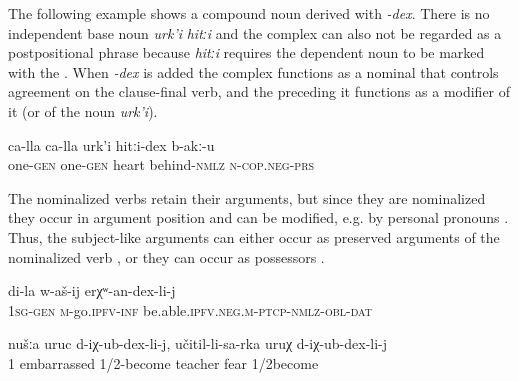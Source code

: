 The following example shows a compound noun derived with \textit{-dex}. There is no independent base noun \textit{urk'i} \textit{hitːi} and the complex can also not be regarded as a postpositional phrase because \textit{hitːi} requires the dependent noun to be marked with the . When \textit{-dex} is added the complex functions as a nominal that controls agreement on the clause-final verb, and the  preceding it functions as a modifier of it (or of the noun \textit{urk'i}).
%
\begin{exe}
	\ex	\label{There is no pity between them}
	\gll	ca-lla	ca-lla	urk'i	hitːi-dex	b-akː-u\\
		one-\textsc{gen}	one-\textsc{gen}	heart	behind-\textsc{nmlz}	\textsc{n}-\textsc{cop.neg}-\textsc{prs} \\
	\glt	{}
\end{exe}

The nominalized verbs retain their arguments, but since they are nominalized they occur in argument position and can be modified, e.g. by personal pronouns . Thus, the subject-like arguments can either occur as preserved arguments of the nominalized verb ,  or they can occur as possessors .
%
\begin{exe} 
	\ex	\label{because of my inability to walk}
	\gll	di-la	w-aš-ij	erχʷ-an-dex-li-j \\
		1\textsc{sg}-\textsc{gen}	\textsc{m}-go.\textsc{ipfv}-\textsc{inf} be.able.\textsc{ipfv}.\textsc{neg}.\textsc{m}-\textsc{ptcp}-\textsc{nmlz}-\textsc{obl}-\textsc{dat}\\
	\glt	{}

	\ex	\label{because of our embarrassment, because of our fear of the teacher}
	\gll	nušːa	uruc	d-iχ-ub-dex-li-j,	učitil-li-sa-rka	uruχ	d-iχ-ub-dex-li-j\\
		1 embarrassed 1/2-become	teacher	fear	1/2become\\
	\glt	{}
\end{exe}

